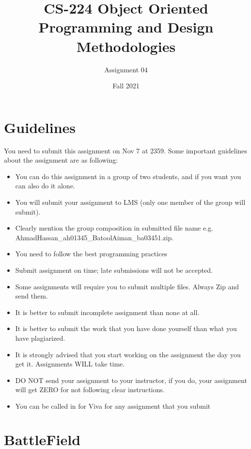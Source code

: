 \documentclass[a4paper,12pt]{article}
\begin{document}
\title{CS-224 Object Oriented Programming and Design Methodologies }
\author{Assignment 04}
\date{Fall 2021}
\maketitle
\section{Guidelines}
You need to submit this assignment on  {\color{red}Nov 7 at 2359}. Some important guidelines about the assignment are as following:

\begin{itemize}
	\item You can do this assignment in a group of two students, and if you want you can also do it alone.
	\item You will submit your assignment to LMS (only one member of the group will submit).
	\item Clearly mention the group composition in submitted file name e.g. AhmadHassan\_ah01345\_BatoolAiman\_ba03451.zip.
	\item You need to follow the best programming practices
	\item Submit assignment on time; late submissions will not be accepted.
	\item Some assignments will require you to submit multiple files. Always Zip and send them.
	\item It is better to submit incomplete assignment than none at all.
	\item It is better to submit the work that you have done yourself than what you have plagiarized.
	\item It is strongly advised that you start working on the assignment the day you get it. Assignments WILL take time.
	\item DO NOT send your assignment to your instructor, if you do, your assignment will get ZERO for not following clear instructions.
	\item You can be called in for Viva for any assignment that you submit
\end{itemize}




\section{BattleField}
\end{document}
